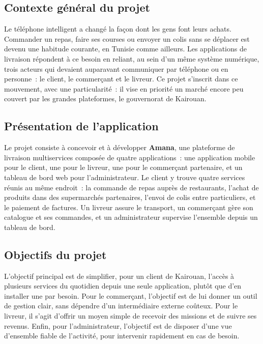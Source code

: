 \documentclass[12pt,fleqn,a4paper]{report}
\begin{document}
\begin{justify}
\renewcommand{\thepage}{\arabic{page}}
\setcounter{page}{1}

\subsection*{Contexte général du projet}

Le téléphone intelligent a changé la façon dont les gens font leurs achats. Commander un repas, faire ses courses ou envoyer un colis sans se déplacer est devenu une habitude courante, en Tunisie comme ailleurs. Les applications de livraison répondent à ce besoin en reliant, au sein d'un même système numérique, trois acteurs qui devaient auparavant communiquer par téléphone ou en personne~: le client, le commerçant et le livreur. Ce projet s'inscrit dans ce mouvement, avec une particularité~: il vise en priorité un marché encore peu couvert par les grandes plateformes, le gouvernorat de Kairouan.

\subsection*{Présentation de l'application}

Le projet consiste à concevoir et à développer \textbf{Amana}, une plateforme de livraison multiservices composée de quatre applications~: une application mobile pour le client, une pour le livreur, une pour le commerçant partenaire, et un tableau de bord web pour l'administrateur. Le client y trouve quatre services réunis au même endroit~: la commande de repas auprès de restaurants, l'achat de produits dans des supermarchés partenaires, l'envoi de colis entre particuliers, et le paiement de factures. Un livreur assure le transport, un commerçant gère son catalogue et ses commandes, et un administrateur supervise l'ensemble depuis un tableau de bord.

\subsection*{Objectifs du projet}

L'objectif principal est de simplifier, pour un client de Kairouan, l'accès à plusieurs services du quotidien depuis une seule application, plutôt que d'en installer une par besoin. Pour le commerçant, l'objectif est de lui donner un outil de gestion clair, sans dépendre d'un intermédiaire externe coûteux. Pour le livreur, il s'agit d'offrir un moyen simple de recevoir des missions et de suivre ses revenus. Enfin, pour l'administrateur, l'objectif est de disposer d'une vue d'ensemble fiable de l'activité, pour intervenir rapidement en cas de besoin.


\end{justify}
\end{document}
